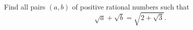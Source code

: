 Find all pairs $(a,b)$ of positive rational numbers such that\[\sqrt{a}+\sqrt{b}=\sqrt{2+\sqrt{3}}. \]